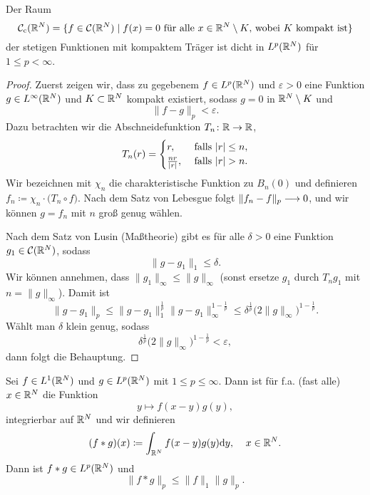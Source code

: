\begin{thm}\label{thm: Cc dicht in Lp}
	Der Raum
	\begin{equation*}
		\mathcal{C}_{\mathrm{c}}(\mathbb{R}^N)=\{f\in\mathcal{C}(\mathbb{R}^N)\mid f(x)=0\text{ für alle }x\in\mathbb{R}^N\setminus K\text{, wobei }K\text{ kompakt ist}\}
	\end{equation*}
	der stetigen Funktionen mit kompaktem Träger ist dicht in \(L^p(\mathbb{R}^N)\) für \(1\leq p<\infty\).
\end{thm}
\begin{proof}
	Zuerst zeigen wir, dass zu gegebenem \(f\in L^p(\mathbb{R}^N)\) und \(\varepsilon>0\) eine Funktion \(g\in L^\infty(\mathbb{R}^N)\) und \(K\subset\mathbb{R}^N\) kompakt existiert, sodass \(g=0\) in \(\mathbb{R}^N\setminus K\) und
	\begin{equation*}
		\|f-g\|_p<\varepsilon.
	\end{equation*}
	Dazu betrachten wir die Abschneidefunktion \(T_n\colon\mathbb{R} \to \mathbb{R}\),
	\begin{equation*}
		T_n(r)=
		\begin{cases}
			r,&\te{ falls }|r|\leq n,\\
			\frac{nr}{|r|},&\te{ falls }|r|>n.
		\end{cases}
	\end{equation*}
	Wir bezeichnen mit \(\chi_n\) die charakteristische Funktion zu \(B_n(0)\) und definieren \(f_n\coloneqq\chi_n\cdot \big(T_n\circ f\big)\). Nach dem Satz von Lebesgue folgt \(\|f_n-f\|_p\longrightarrow0\), und wir können \(g=f_n\) mit \(n\) groß genug wählen.
	
	Nach dem Satz von Lusin (Maßtheorie) gibt es für alle \(\delta>0\) eine Funktion \(g_1\in\mathcal{C}(\mathbb{R}^N)\), sodass
	\begin{equation*}
		\|g-g_1\|_1\leq\delta.
	\end{equation*}
	Wir können annehmen, dass \(\|g_1\|_\infty\leq\|g\|_\infty\) (sonst ersetze \(g_1\) durch \(T_ng_1\) mit \(n=\|g\|_\infty\)). Damit ist
	\begin{equation*}
		\|g-g_1\|_p\leq\|g-g_1\|_1^\frac{1}{p}\|g-g_1\|_\infty^{1-\frac{1}{p}}\leq\delta^{\frac{1}{p}}\big(2\|g\|_\infty\big)^{1-\frac{1}{p}}.
	\end{equation*}
	Wählt man \(\delta\) klein genug, sodass
	\begin{equation*}
		\delta^\frac{1}{p}\big(2\|g\|_\infty\big)^{1-\frac{1}{p}}<\varepsilon,
	\end{equation*}
	dann folgt die Behauptung.
\end{proof}
\begin{de+sa}[Faltung]\label{def und satz: faltung}
	Sei \(f\in L^1(\mathbb{R}^N)\) und \(g\in L^p(\mathbb{R}^N)\) mit \(1\leq p\leq\infty\). Dann ist für f.a. (fast alle) \(x\in\mathbb{R}^N\) die Funktion
	\begin{equation*}
		y\mapsto f(x-y)g(y),
	\end{equation*}
	integrierbar auf \(\mathbb{R}^N\) und wir definieren
	\begin{equation*}
		(f\ast g)(x)\coloneqq\int_{\mathbb{R}^N} f(x-y)g(y)\mathrm{d}y,\;\;\;\;x\in\mathbb{R}^N.
	\end{equation*}
	Dann ist \(f\ast g\in L^p(\mathbb{R}^N)\) und 
	\begin{equation*}
		\|f\ast g\|_p\leq\|f\|_1\|g\|_p.
	\end{equation*}
\end{de+sa}

